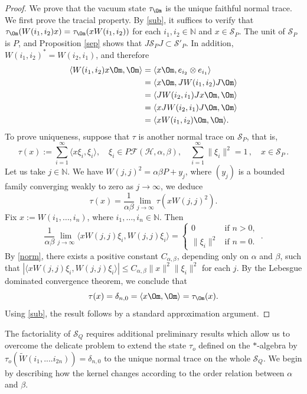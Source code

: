 \documentclass[12pt]{amsart}
\numberwithin{equation}{section}
\def\cf{{\mathcal F}}
\def\ch{{\mathcal H}}
\def\bn{{\mathbb N}}
\def\a{\alpha}
\def\b{\beta}
\def\d{\delta}  \def\D{\Delta}
\def\t{\tau}
\theoremstyle{definition}
\begin{document}
\begin{proof}
We prove that the vacuum state $\t_{\Om}$ is the unique faithful normal trace.\\
We first prove the tracial property. By \eqref{sub}, it suffices to verify that
$\t_{\Om}(W(i_1,i_2)x)=\t_{\Om}(xW(i_1,i_2))$
for each $i_1,i_2\in\bn$ and $x\in\mathcal{S}_P$. The unit of $\mathcal{S}_P$ is $P$, and  Proposition \ref{sep} shows that
$J\mathcal{S}_PJ\subset \mathcal{S}'_P$. In addition, $W(i_1,i_2)^*=W(i_2,i_1)$, and therefore
\begin{align*}
\langle W(i_1,i_2)x\Om,\Om\rangle
&= \langle x\Om, e_{i_2}\otimes e_{i_1}\rangle\\
&= \langle x\Om, JW(i_1,i_2)J\Om\rangle\\
&= \langle JW(i_2,i_1)Jx\Om,\Om\rangle\\
&= \langle xJW(i_2,i_1)J\Om,\Om\rangle\\
&= \langle x W(i_1,i_2)\Om,\Om\rangle.
\end{align*}
To prove uniqueness, suppose that $\t$ is another normal trace on $\mathcal{S}_P$, that is,
\[
\t(x):=\sum_{i=1}^{\infty} \langle x\xi_i,\xi_i\rangle,
\quad \xi_i\in P\cf(\ch,\a,\b),\quad \sum_{i=1}^{\infty}\|\xi_i\|^2=1\,, \quad x\in\mathcal{S}_P\,.
\]
Let us take $j\in\bn$.  We have $W(j,j)^2=\a\b P + y_j$, where $(y_j)$ is a bounded family converging weakly to zero as $j\to\infty$, we deduce
\[
\t(x)=\frac{1}{\a\b}\lim_{j\rightarrow \infty} \t(xW(j,j)^2).
\]
Fix $x:= W(i_1,\ldots, i_n)$, where $i_1,\ldots,i_n\in\bn$. Then
\[
\frac{1}{\a\b} \lim_{j\rightarrow \infty}\langle xW(j,j)\xi_i,W(j,j)\xi_i\rangle
=\begin{cases}
0 &\text{if } n>0,\\
\|\xi_i\|^2 &\text{if } n=0.
\end{cases}\,.
\]
By \eqref{norm}, there exists a positive constant $C_{\a,\b}$, depending only on $\a$ and $\b$, such that $|\langle xW(j,j)\xi_i,W(j,j)\xi_i\rangle|\leq C_{\alpha,\beta} \|x\|^2\|\xi_i\|^2$ for each $j$. By the Lebesgue dominated convergence theorem, we conclude that
\[
\t(x)=\d_{n,0}=\langle x\Om,\Om\rangle=\t_{\Om}(x).
\]
Using \eqref{sub}, the result follows by a standard approximation argument.
\end{proof}

The factoriality of $\mathcal{S}_Q$ requires additional preliminary results which allow us to overcome the delicate problem to extend the state $\t_o$ defined on the $*$-algebra by $\tau_o(\widetilde W(i_1,....i_{2n}))=\delta_{n,0}$ to the unique normal trace on the whole $\mathcal{S}_Q$. We begin by describing how the kernel changes according to the order relation between $\a$ and $\b$.
\end{document}
